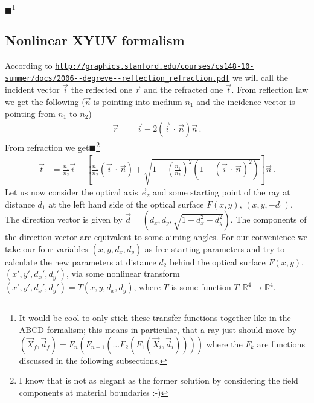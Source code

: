 \documentclass[12pt,a4paper,twoside,openright,BCOR10mm,headsepline,titlepage,abstracton,chapterprefix,final]{scrreprt}
\newcommand{\scpm}[2]{(#1\,\cdot\,#2)}
\newcommand{\remark}[1]{{\color{red}$\blacksquare$}\footnote{{\color{red}#1}}}
\begin{document}
\remark{It would be cool to only stich these transfer functions together like in the ABCD formalism;
this means in particular, that a ray just should move by $(\vec{X}_f, \vec{d}_f) = F_n (F_{n-1}( \dots F_2 (F_1(\vec{X}_i, \vec{d}_i))))$ where
the $F_k$ are functions discussed in the following subsections.}

\subsection{Nonlinear XYUV formalism}
According to {{\tt \url{http://graphics.stanford.edu/courses/cs148-10-summer/docs/2006--degreve--reflection_refraction.pdf}}}
we will call the incident vector $\vec{i}$ the reflected one $\vec{r}$ and the refracted one $\vec{t}$.
From reflection law we get the following ($\vec{n}$ is pointing into medium $n_1$ and the incidence vector is pointing from $n_1$ to $n_2$)
\begin{align}
 \vec{r} &= \vec{i} - 2 \scpm{\vec{i}}{\vec{n}} \vec{n}\,.\label{eq:reflection_vector}
\end{align}
From refraction we get\remark{I know that is not as elegant as the former 
solution by considering the field components at material boundaries :-)}
\begin{align}
 \vec{t} &= \frac{n_1}{n_2} \vec{i} 
 - \left[\frac{n_1}{n_2} \scpm{\vec{i}}{\vec{n}} 
      + \sqrt{1 - \left(\frac{n_1}{n_2}\right)^2 (1 - {\scpm{\vec{i}}{\vec{n}}}^2)}\right] \vec{n}\,.\label{eq:refraction_vector}
\end{align}
Let us now consider the optical axis $\vec{e}_z$ and some starting point of the ray at distance $d_1$ at the left hand side
of the optical surface $F(x, y)$, $(x,y,-d_1)$. The direction vector is given by $\vec{d} = (d_x, d_y, \sqrt{1 - d_x^2 - d_y^2})$.
The components of the direction vector are equivalent to some aiming angles. For our convenience we take our
four variables $(x, y, d_x, d_y)$ as free starting parameters and try to calculate the new parameters at distance $d_2$ behind the
optical surface $F(x, y)$, $(x', y', {d_x}', {d_y}')$, via some nonlinear transform $(x', y', {d_x}', {d_y}') = T(x, y, d_x, d_y)$,
where $T$ is some function $T:\mathbb{R}^4 \to \mathbb{R}^4$.
\end{document}

